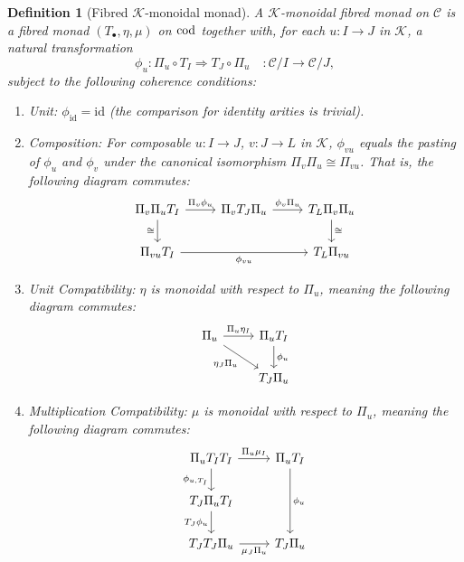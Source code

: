 \documentclass{article}
\newtheorem{definition}{Definition}
\begin{document}
\begin{definition}[Fibred $\mathcal{K}$-monoidal monad]
A \emph{$\mathcal{K}$-monoidal fibred monad} on $\mathcal{C}$ is a fibred monad $(T_\bullet, \eta, \mu)$ on $\rm{cod}$ together with, for each $u : I \to J$ in $\mathcal{K}$, a natural transformation
\[
\phi_u : \Pi_u \circ T_I \Longrightarrow T_J \circ \Pi_u \quad : \mathcal{C}/I \to \mathcal{C}/J,
\]
subject to the following coherence conditions:
\begin{enumerate}
    \item \emph{Unit:} $\phi_{\mathrm{id}} = \mathrm{id}$ (the comparison for identity arities is trivial).
    
    \item \emph{Composition:} For composable $u : I \to J$, $v : J \to L$ in $\mathcal{K}$, $\phi_{vu}$ equals the pasting of $\phi_u$ and $\phi_v$ under the canonical isomorphism $\Pi_v \Pi_u \cong \Pi_{vu}$. That is, the following diagram commutes:
    \[\begin{tikzcd}
    {\Pi_v \Pi_u T_I} & {\Pi_v T_J \Pi_u} & {T_L \Pi_v \Pi_u} \\
    {\Pi_{vu} T_I} & & {T_L \Pi_{vu}}
    \arrow["{\Pi_v \phi_u}", from=1-1, to=1-2]
    \arrow["{\phi_v \Pi_u}", from=1-2, to=1-3]
    \arrow["\cong"', from=1-1, to=2-1]
    \arrow["\cong", from=1-3, to=2-3]
    \arrow["{\phi_{vu}}"', from=2-1, to=2-3]
    \end{tikzcd}\]
    
    \item \emph{Unit Compatibility:} $\eta$ is monoidal with respect to $\Pi_u$, meaning the following diagram commutes:
    \[\begin{tikzcd}
    {\Pi_u} & {\Pi_u T_I} \\
    & {T_J \Pi_u}
    \arrow["{\Pi_u \eta_I}", from=1-1, to=1-2]
    \arrow["{\eta_J \Pi_u}"', from=1-1, to=2-2]
    \arrow["{\phi_u}", from=1-2, to=2-2]
    \end{tikzcd}\]
    
    \item \emph{Multiplication Compatibility:} $\mu$ is monoidal with respect to $\Pi_u$, meaning the following diagram commutes:
    \[\begin{tikzcd}
    {\Pi_u T_I T_I} & {\Pi_u T_I} \\
    {T_J \Pi_u T_I} \\
    {T_J T_J \Pi_u} & {T_J \Pi_u}
    \arrow["{\Pi_u \mu_I}", from=1-1, to=1-2]
    \arrow["{\phi_{u, T_I}}"', from=1-1, to=2-1]
    \arrow["{\phi_u}", from=1-2, to=3-2]
    \arrow["{T_J \phi_u}"', from=2-1, to=3-1]
    \arrow["{\mu_J \Pi_u}"', from=3-1, to=3-2]
    \end{tikzcd}\]


\end{enumerate}
\end{definition}
\end{document}

